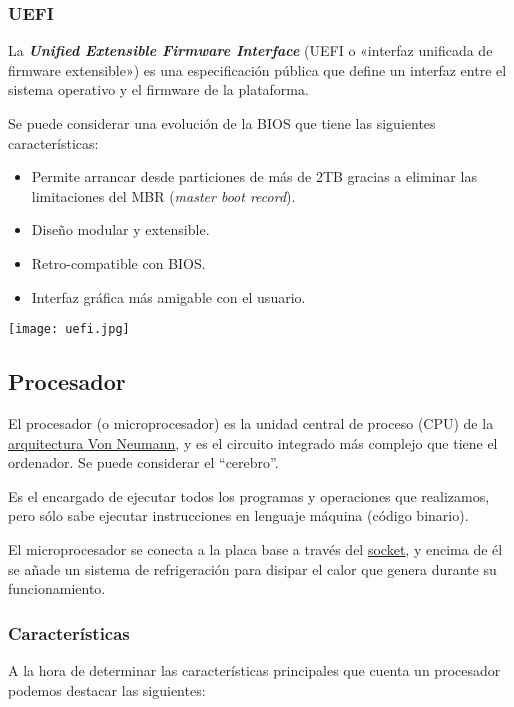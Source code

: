 \hypertarget{UFI}{}
\subsubsection{UEFI}
La \textit{\textbf{Unified Extensible Firmware Interface}} (UEFI o «interfaz unificada de firmware extensible») es una especificación pública que define un interfaz entre el sistema operativo y el firmware de la plataforma.

Se puede considerar una evolución de la BIOS  que tiene las siguientes características:

\begin{itemize}
    \item Permite arrancar desde particiones de más de 2TB gracias a eliminar las limitaciones del MBR (\textit{master boot record}).
    \item Diseño modular y extensible.
    \item Retro-compatible con BIOS.
    \item Interfaz gráfica más amigable con el usuario.
\end{itemize}


\begin{center}
    \texttt{[image: uefi.jpg]}
\end{center}


\subsection{Procesador}
El procesador (o microprocesador) es la unidad central de proceso (CPU) de la \hyperlink{von_neumann}{arquitectura Von Neumann}, y es el  circuito integrado más complejo que tiene el ordenador. Se puede considerar el “cerebro”.

Es el encargado de ejecutar todos los programas y operaciones que realizamos, pero sólo sabe ejecutar instrucciones en lenguaje máquina (código binario).

El microprocesador se conecta a la placa base a través del \hyperlink{socket}{socket}, y encima de él se añade un sistema de refrigeración para disipar el calor que genera durante su funcionamiento.


\subsubsection{Características}
A la hora de determinar las características principales que cuenta un procesador podemos destacar las siguientes:

